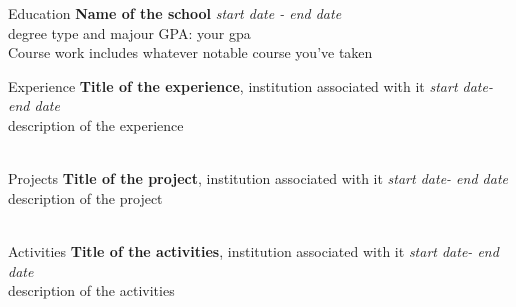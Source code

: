 


\begin{rSection}{Education}
{\bf Name of the school} \hfill {\em start date - end date} 
\\ degree type and majour\hfill { GPA: your gpa }
\\ Course work includes whatever notable course you've taken
\\

\end{rSection}
\begin{rSection}{Experience}
{\bf Title of the experience}{, institution associated with it} \hfill {\em start date- end date}\\
description of the experience\\\\
\end{rSection}
\begin{rSection}{Projects}
{\bf Title of the project}{, institution associated with it} \hfill {\em start date- end date}\\
description of the project\\\\
\end{rSection}
\begin{rSection}{Activities}
{\bf Title of the activities}{, institution associated with it} \hfill {\em start date- end date}\\
description of the activities\\\\
\end{rSection}
